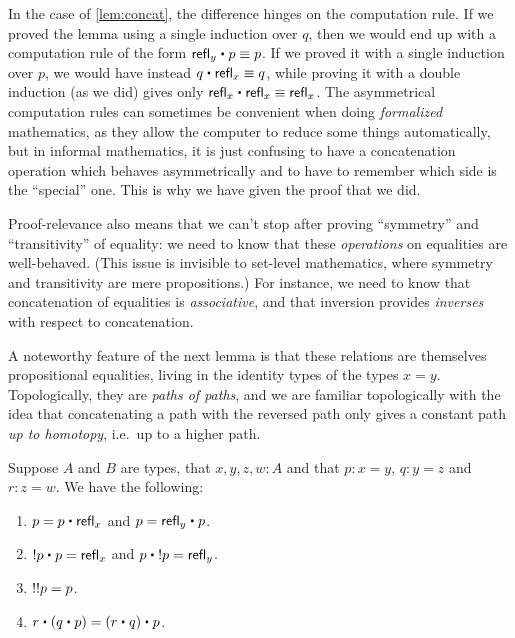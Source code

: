 In the case of \autoref{lem:concat}, the difference hinges on the computation rule.
If we proved the lemma using a single induction over $q$, then we would end up with a computation rule of the form $\refl{y} \ct p \jdeq p$.
If we proved it with a single induction over $p$, we would have instead $q\ct\refl{x}\jdeq q$, while proving it with a double induction (as we did) gives only $\refl{x}\ct\refl{x} \jdeq \refl{x}$.
The asymmetrical computation rules can sometimes be convenient when doing \emph{formalized} mathematics, as they allow the computer to reduce some things automatically, but in informal mathematics, it is just confusing to have a concatenation operation which behaves asymmetrically and to have to remember which side is the ``special'' one.
This is why we have given the proof that we did.

Proof-relevance also means that we can't stop after proving ``symmetry'' and  ``transitivity'' of equality: we need to know that these \emph{operations} on equalities are well-behaved.
(This issue is invisible to set-level mathematics, where symmetry and transitivity are mere propositions.)
For instance, we need to know that concatenation of equalities is \emph{associative}, and that inversion provides \emph{inverses} with respect to concatenation.

A noteworthy feature of the next lemma is that these relations are themselves propositional equalities, living in the identity types of the types $x= y$.
Topologically, they are \emph{paths of paths}, and we are familiar topologically with the idea that concatenating a path with the reversed path only gives a constant path \emph{up to homotopy}, i.e.\ up to a higher path.

\begin{lem}%
  Suppose $A$ and $B$ are types, that $x,y,z,w:A$ and that $p:x= y$, $q:y = z$ and $r:z=w$.
  We have the following:
  \begin{enumerate}
  \item $p= p\ct \refl{x}$ and $p = \refl{y} \ct p$.
  \item $\opp{p}\ct p=  \refl{x}$ and $p\ct \opp{p}= \refl{y}$.
  \item $\mathord{!{\mathord{!{p}}}}= p$.
  \item $r\ct (q\ct p)=  (r\ct q)\ct p$.
  \end{enumerate}
\end{lem}

